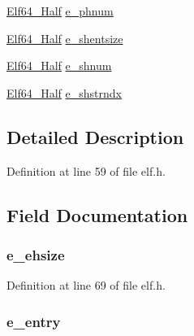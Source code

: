 \begin{DoxyCompactItemize}
\item 
\hyperlink{elf_8h_adb6a5584018b431da3472e7c6a7fd731}{Elf64\-\_\-\-Half} \hyperlink{struct_elf64___ehdr_ae779357415824f941ac34a8bb8c6d0d0}{e\-\_\-phnum}
\item 
\hyperlink{elf_8h_adb6a5584018b431da3472e7c6a7fd731}{Elf64\-\_\-\-Half} \hyperlink{struct_elf64___ehdr_a0e1c14f7fe57fb45572a4a791387b9bd}{e\-\_\-shentsize}
\item 
\hyperlink{elf_8h_adb6a5584018b431da3472e7c6a7fd731}{Elf64\-\_\-\-Half} \hyperlink{struct_elf64___ehdr_a7cda622471b8164c7233d2581bff8970}{e\-\_\-shnum}
\item 
\hyperlink{elf_8h_adb6a5584018b431da3472e7c6a7fd731}{Elf64\-\_\-\-Half} \hyperlink{struct_elf64___ehdr_a4534680060068929d792d8cd35fc91fc}{e\-\_\-shstrndx}
\end{DoxyCompactItemize}


\subsection{Detailed Description}


Definition at line 59 of file elf.\-h.



\subsection{Field Documentation}
\hypertarget{struct_elf64___ehdr_a302628c79818430e012cb39ebe173eac}{
\subsubsection[{e\-\_\-ehsize}]{ e\-\_\-ehsize}}\label{struct_elf64___ehdr_a302628c79818430e012cb39ebe173eac}


Definition at line 69 of file elf.\-h.

\hypertarget{struct_elf64___ehdr_a4098f902aafba5f23ad6d5506e540e2d}{
\subsubsection[{e\-\_\-entry}]{ e\-\_\-entry}}\label{struct_elf64___ehdr_a4098f902aafba5f23ad6d5506e540e2d}


